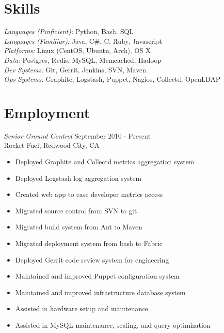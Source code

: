 \documentclass[line,margin]{res}
\begin{document}
\address{Sunnyvale, CA 94087}
\address{\sl tabletcorry@gmail.com}

\begin{resume}
 
\section{Skills} {\sl Languages (Proficient):} Python, Bash, SQL\\
                {\sl Languages (Familiar):} Java, C\#, C, Ruby, Javascript\\
                {\sl Platforms:} Linux (CentOS, Ubuntu, Arch), OS X\\
                {\sl Data:} Postgres, Redis, MySQL, Memcached, Hadoop\\
                {\sl Dev Systems:} Git, Gerrit, Jenkins, SVN, Maven\\
                {\sl Ops Systems:} Graphite, Logstash, Puppet, Nagios, Collectd, OpenLDAP
 
\section{Employment} 
                {\sl Senior Ground Control} \hfill September 2010 - Present \\
                Rocket Fuel, Redwood City, CA
                \begin{itemize}  \itemsep -2pt
                 \item Deployed Graphite and Collectd metrics aggregation system
                 \item Deployed Logstash log aggregation system
                 \item Created web app to ease developer metrics access
                 \item Migrated source control from SVN to git
                 \item Migrated build system from Ant to Maven
                 \item Migrated deployment system from bash to Fabric
                 \item Deployed Gerrit code review system for engineering
                 \item Maintained and improved Puppet configuration system
                 \item Maintained and improved infrastructure database system
                 \item Assisted in hardware setup and maintenance
                 \item Assisted in MySQL maintenance, scaling, and query optimization
                \end{itemize}


\end{resume}
\end{document}
